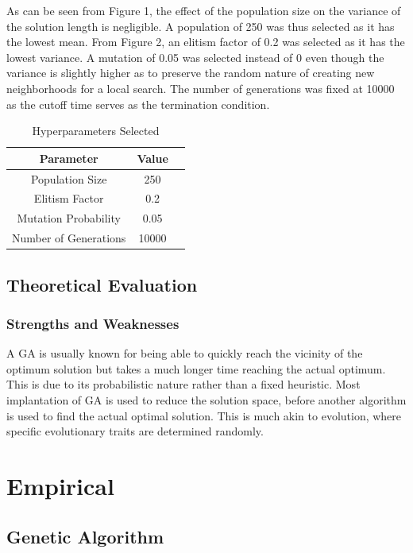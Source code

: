 \documentclass[sigconf]{acmart}
\begin{document}
As can be seen from Figure 1, the effect of the population size on the variance of the solution length is negligible. A population of 250 was thus selected as it has the lowest mean. From Figure 2, an elitism factor of 0.2 was selected as it has the lowest variance. A mutation of 0.05 was selected instead of 0 even though the variance is slightly higher as to preserve the random nature of creating new neighborhoods for a local search. The number of generations was fixed at 10000 as the cutoff time serves as the termination condition.

\begin{table}
  \caption{Hyperparameters Selected}
  \label{tab:freq}
  \begin{tabular}{ccl}
    \toprule
    Parameter&Value\\
    \midrule
    Population Size & 250\\
    Elitism Factor & 0.2\\
    Mutation Probability & 0.05\\
    Number of Generations & 10000\\
  \bottomrule
\end{tabular}
\end{table}

\subsection{Theoretical Evaluation}
\subsubsection{Strengths and Weaknesses}
A GA is usually known for being able to quickly reach the vicinity of the optimum solution but takes a much longer time reaching the actual optimum. This is due to its probabilistic nature rather than a fixed heuristic. Most implantation of GA is used to reduce the solution space, before another algorithm is used to find the actual optimal solution. This is much akin to evolution, where specific evolutionary traits are determined randomly.

\section{Empirical}
\subsection{Genetic Algorithm}
\end{document}
